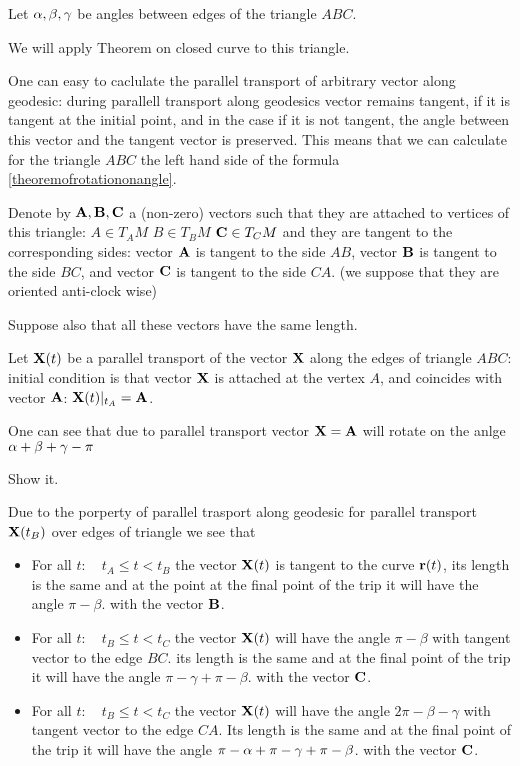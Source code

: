 \documentclass[12pt]{article}
\theoremstyle{theorem}
\numberwithin{equation}{section}
\begin{document}
{{{  Let $\alpha,\beta,\gamma$ be angles between edges
of the triangle $ABC$.
 
     We will apply Theorem on closed curve to this triangle.
 
  One can easy to caclulate the parallel transport of
arbitrary vector along geodesic:
during parallell transport along geodesics vector remains tangent,
if it is tangent at the initial point, and in the case if it is not
tangent, the angle between this vector and the tangent vector is 
preserved.   This means that we can calculate for the triangle
$ABC$ the left hand side of the formula 
\eqref{theoremofrotationonangle}.

Denote by ${\bf A},{\bf B},{\bf C}$ a (non-zero) vectors such that
they are attached to vertices of this triangle:
   $A\in T_A M$ 
   $B\in T_B M$ 
   ${\bf C}\in T_C M$ 
and they are tangent 
to the corresponding sides: 
vector ${\bf A}$ is tangent to the side $AB$,
vector ${\bf B}$ is tangent to the side $BC$,
and
vector ${\bf C}$ is tangent to the side $CA$.
(we suppose that they are oriented anti-clock wise)
      
Suppose also that all these vectors have the same length.       


Let ${\bf X}(t)$ be a parallel transport of the vector
${\bf X}$ along the edges of triangle $ABC$:  initial condition is
that vector ${\bf X}$ is attached at the vertex $A$,
and coincides with vector ${\bf A}$: ${\bf X}(t)\vert_{t_A}={\bf A}$.


One can see that due to parallel transport vector ${\bf X}={\bf A}$
will rotate on the anlge $\alpha+\beta+\gamma-\pi$

{\footnotesize  
Show it.
 
Due to the porperty of parallel
trasport along geodesic for parallel transport
${\bf X}(t_B)$ over edges of triangle we see that

 \begin{itemize}
\item For all $t\colon\quad t_A\leq t< t_B$ 
the vector ${\bf X}(t)$ is tangent to
the curve ${\bf r}(t)$, its length is the same and at the point 
at the final point of the trip it
will have the angle $\pi-\beta$.
with the vector ${\bf B}$.

\item For all $t\colon\quad t_B\leq t< t_C$ 
the vector ${\bf X}(t)$ will  have the angle $\pi-\beta$
with tangent vector to the edge $BC$.
its length is the same and 
at the final point of the trip it
will have the angle $\pi-\gamma+\pi-\beta$.
with the vector ${\bf C}$.

\item For all $t\colon\quad t_B\leq t< t_C$ 
the vector ${\bf X}(t)$ will  have the angle $2\pi-\beta-\gamma$
with tangent vector to the edge $CA$.
Its length is the same and 
at the final point of the trip it
will have the angle $\pi-\alpha+\pi-\gamma+\pi-\beta$.
with the vector ${\bf C}$.



\end{itemize}}}}}
\end{document}
